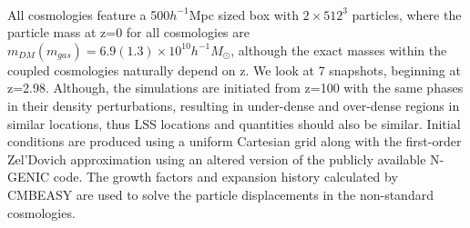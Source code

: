 \documentclass[a4paper,fleqn,usenatbib]{mnras}
\begin{document}
\\
All cosmologies feature a 500$h^{-1}$Mpc sized box with $2 \times 512^{3}$ particles, where the particle mass at z=0 for all cosmologies are $m_{DM}(m_{gas})=6.9(1.3)\times 10^{10}h^{-1}M_{\odot}$, although the exact masses within the coupled cosmologies naturally depend on z. We look at 7 snapshots, beginning at z=2.98. Although, the simulations are initiated from z=100 with the same phases in their density perturbations, resulting in under-dense and over-dense regions in similar locations, thus LSS locations and quantities should also be similar. Initial conditions are produced using a uniform Cartesian grid along with the first-order Zel'Dovich approximation using an altered version of the publicly available N-GENIC code. The growth factors and expansion history calculated by CMBEASY are used to solve the particle displacements in the non-standard cosmologies. 
\end{document}
